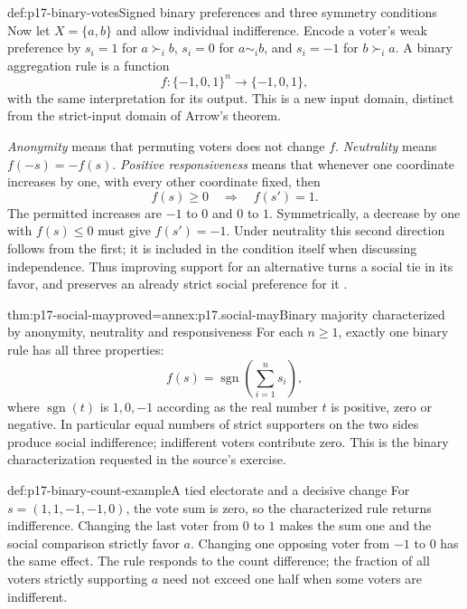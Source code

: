 \begin{hbdefinition}{def:p17-binary-votes}{Signed binary preferences and three symmetry conditions}
Now let \(X=\{a,b\}\) and allow individual indifference. Encode a voter's
weak preference by \(s_i=1\) for \(a\succ_i b\), \(s_i=0\) for
\(a\sim_i b\), and \(s_i=-1\) for \(b\succ_i a\).
A binary aggregation rule is a function
\[
                   f:\{-1,0,1\}^n\longrightarrow\{-1,0,1\},
\]
with the same interpretation for its output. This is a new input domain,
distinct from the strict-input domain of Arrow's theorem.

\emph{Anonymity} means that permuting voters does not change \(f\).
\emph{Neutrality} means \(f(-s)=-f(s)\).
\emph{Positive responsiveness} means that whenever one coordinate
increases by one, with every other coordinate fixed, then
\[
                   f(s)\geq0\quad\Longrightarrow\quad f(s')=1.
\]
The permitted increases are \(-1\) to \(0\) and \(0\) to \(1\).
Symmetrically, a decrease by one with \(f(s)\leq0\) must give
\(f(s')=-1\). Under neutrality this second direction follows from the
first; it is included in the condition itself when discussing independence.
Thus improving support for an alternative turns a social tie in its favor,
and preserves an already strict social preference for it
\cite[p.~128, problem~1]{Rubinstein2015LectureNotes}.
\end{hbdefinition}

\begin{hbtheorem}{thm:p17-social-may}{proved=annex:p17.social-may}{Binary majority characterized by anonymity, neutrality and responsiveness}
For each \(n\geq1\), exactly one binary rule has all three properties:
\[
 f(s)=\operatorname{sgn}\left(\sum_{i=1}^n s_i\right),
\]
where \(\operatorname{sgn}(t)\) is \(1,0,-1\) according as the real
number \(t\) is positive, zero or negative.
In particular equal numbers of strict supporters on the two sides produce
social indifference; indifferent voters contribute zero.
This is the binary characterization requested in the source's exercise.
\end{hbtheorem}

\begin{hbexample}{def:p17-binary-count-example}{A tied electorate and a decisive change}
For \(s=(1,1,-1,-1,0)\), the vote sum is zero, so the characterized
rule returns indifference. Changing the last voter from \(0\) to \(1\)
makes the sum one and the social comparison strictly favor \(a\).
Changing one opposing voter from \(-1\) to \(0\) has the same effect.
The rule responds to the count difference; the fraction of all voters
strictly supporting \(a\) need not exceed one half when some voters
are indifferent.
\end{hbexample}

